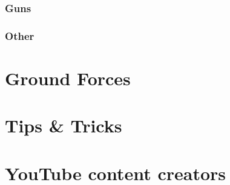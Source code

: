 \documentclass[10pt,a4paper,oneside]{article}
\begin{document}
\section{Guns}








\section{Other}








\newpage
\part{Ground Forces}




\newpage
\part{Tips \& Tricks}


\newpage
\part{YouTube content creators}

\end{document}
